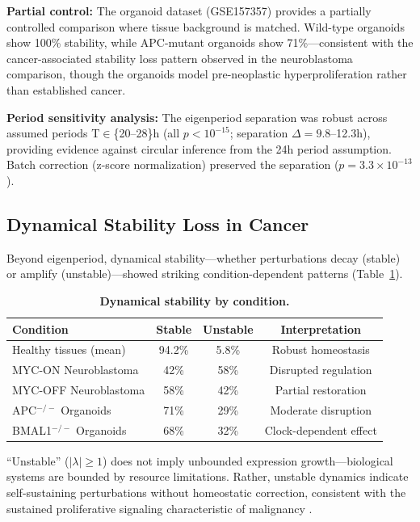 \documentclass[11pt,letterpaper]{article}
\begin{document}
\textbf{Partial control:} The organoid dataset (GSE157357) provides a partially controlled comparison where tissue background is matched. Wild-type organoids show 100\% stability, while APC-mutant organoids show 71\%---consistent with the cancer-associated stability loss pattern observed in the neuroblastoma comparison, though the organoids model pre-neoplastic hyperproliferation rather than established cancer.

\textbf{Period sensitivity analysis:} The eigenperiod separation was robust across assumed periods T$\in$\{20--28\}h (all $p < 10^{-15}$; separation $\Delta = 9.8$--12.3h), providing evidence against circular inference from the 24h period assumption. Batch correction (z-score normalization) preserved the separation ($p = 3.3 \times 10^{-13}$).

\subsection{Dynamical Stability Loss in Cancer}

Beyond eigenperiod, dynamical stability---whether perturbations decay (stable) or amplify (unstable)---showed striking condition-dependent patterns (Table~\ref{tab:stability}).

\begin{table}[H]
\centering
\caption{\textbf{Dynamical stability by condition.}}
\label{tab:stability}
\begin{tabular}{lccc}
\toprule
Condition & Stable & Unstable & Interpretation \\
\midrule
Healthy tissues (mean) & 94.2\% & 5.8\% & Robust homeostasis \\
MYC-ON Neuroblastoma & 42\% & 58\% & Disrupted regulation \\
MYC-OFF Neuroblastoma & 58\% & 42\% & Partial restoration \\
APC$^{-/-}$ Organoids & 71\% & 29\% & Moderate disruption \\
BMAL1$^{-/-}$ Organoids & 68\% & 32\% & Clock-dependent effect \\
\bottomrule
\end{tabular}
\end{table}

``Unstable'' ($|\lambda| \geq 1$) does not imply unbounded expression growth---biological systems are bounded by resource limitations. Rather, unstable dynamics indicate self-sustaining perturbations without homeostatic correction, consistent with the sustained proliferative signaling characteristic of malignancy \citep{hanahan2011}.
\end{document}
